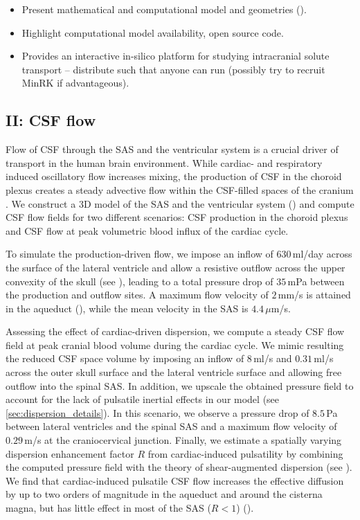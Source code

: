 \documentclass[fleqn,10pt]{wlscirep}
\newcommand{\draft}[1]{\textcolor{gray}{#1}}
\begin{document}
\begin{itemize}
\item
  Present mathematical and computational model and geometries (). 
\item
  Highlight computational model availability, open source code.
\item
  Provides an interactive in-silico platform for studying intracranial solute transport -- distribute such that anyone can run (possibly try to recruit MinRK if advantageous).
\end{itemize}

\draft{\lipsum[1]}



\subsection*{II: CSF flow}

Flow of CSF through the SAS and the ventricular system is a crucial driver of transport in the human brain environment. While cardiac- and respiratory induced oscillatory flow increases mixing, the production of CSF in the choroid plexus creates a steady advective flow within the CSF-filled spaces of the cranium \cite{hornkjol2022csf}. 
We construct a 3D model of the SAS and the ventricular system () and compute CSF flow fields for two different scenarios: CSF production in the choroid plexus and CSF flow at peak volumetric blood influx of the cardiac cycle.

To simulate the production-driven flow, we impose an inflow of $630\,$ml/day \cite{nilsson1992circadian} across the surface of the lateral ventricle and allow a resistive outflow across the upper convexity of the skull (see ), leading to a total pressure drop of $35\,$mPa between the production and outflow sites. A maximum flow velocity of $2\,$mm/s is attained in the aqueduct (), while the mean velocity in the SAS is $4.4\,\mu$m/s.

Assessing the effect of cardiac-driven dispersion, we compute a steady CSF flow field at peak cranial blood volume during the cardiac cycle. We mimic resulting the reduced CSF space volume by imposing an inflow of $8\,$ml/s and $0.31\,$ml/s across the outer skull surface and the lateral ventricle surface and allowing free outflow into the spinal SAS. In addition, we upscale the obtained pressure field to account for the lack of pulsatile inertial effects in our model (see \ref{sec:dispersion_details}). In this scenario, we observe a pressure drop of $8.5\,$Pa between lateral ventricles and the spinal SAS and a maximum flow velocity of $0.29\,$m/s at the craniocervical junction.
Finally, we estimate a spatially varying dispersion enhancement factor $R$ from cardiac-induced pulsatility by combining the computed pressure field with the theory of shear-augmented dispersion (see ). We find that cardiac-induced pulsatile CSF flow increases the effective diffusion by up to two orders of magnitude in the aqueduct and around the cisterna magna, but has little effect in most of the SAS ($R < 1$) (). 
\end{document}
